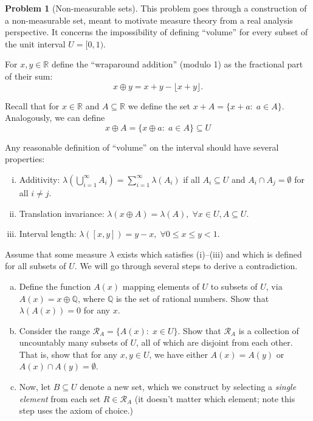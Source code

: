 \documentclass{article}
\newcommand{\cR}{\mathcal{R}}
\newcommand{\QQ}{\mathbb{Q}}
\newcommand{\RR}{\mathbb{R}}
\theoremstyle{definition}
\newtheorem{problem}{Problem}
\begin{document}
\begin{problem}[Non-measurable sets]
\label{prob:non-measurable}
This problem goes through a construction of a non-measurable set, meant to motivate measure theory from a real analysis perspective. It concerns the impossibility of defining ``volume'' for every subset of the unit interval $U=[0,1)$.

For $x,y \in \RR$ define the ``wraparound addition'' (modulo 1) as the fractional part of their sum:
\[
x \oplus y = x + y - \lfloor x + y \rfloor.
\]

Recall that for $x \in \RR$ and $A \subseteq \RR$ we define the set $x + A = \{x + a:\; a \in A\}$. Analogously, we can define 
\[
x \oplus A = \{x \oplus a:\; a \in A\} \subseteq U
\]

Any reasonable definition of ``volume'' on the interval should have several properties:
\begin{enumerate}[(i)]
\item Additivity: $\lambda(\bigcup_{i=1}^\infty A_i) = \sum_{i=1}^\infty \lambda(A_i)$ if all $A_i\subseteq U$ and $A_i \cap A_j = \emptyset$ for all $i \neq j$.
\item Translation invariance: $\lambda(x \oplus A) = \lambda(A), \;\forall x\in U, A\subseteq U$.
\item Interval length: $\lambda([x,y]) = y - x, \;\forall 0 \leq x \leq y < 1$.
\end{enumerate}
Assume that some measure $\lambda$ exists which satisfies (i)--(iii) and which is defined for all subsets of $U$. We will go through several steps to derive a contradiction.

\begin{enumerate}[(a)]
\item Define the function $A(x)$ mapping elements of $U$ to subsets of $U$, via $A(x) = x \oplus \QQ$, where $\QQ$ is the set of rational numbers. Show that $\lambda(A(x)) = 0$ for any $x$.




\item Consider the range $\cR_A = \{A(x):\; x\in U\}$. Show that $\cR_A$ is a collection of uncountably many subsets of $U$, all of which are disjoint from each other. That is, show that for any $x,y\in U$, we have either $A(x)=A(y)$ or $A(x) \cap A(y) = \emptyset$.




\item Now, let $B\subseteq U$ denote a new set, which we construct by selecting a {\em single element} from each set $R\in\cR_A$ (it doesn't matter which element; note this step uses the axiom of choice.)


\end{enumerate}
\end{problem}
\end{document}
